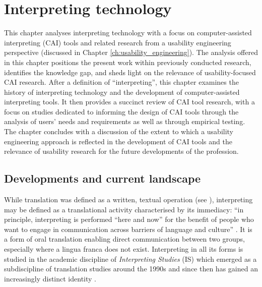 \chapter{Interpreting technology}\label{ch:interpreting_technology}

This chapter analyses interpreting technology with a focus on computer-assisted interpreting (CAI) tools and related research from a usability engineering perspective (discussed in Chapter \ref{ch:usability_engineering}). The analysis offered in this chapter positions the present work within previously conducted research, identifies the knowledge gap, and sheds light on the relevance of usability-focused CAI research. After a definition of ``interpreting'', this chapter examines the history of interpreting technology and the development of computer-assisted interpreting tools. It then provides a succinct review of CAI tool research, with a focus on studies dedicated to informing the design of CAI tools through the analysis of users’ needs and requirements as well as through empirical testing. The chapter concludes with a discussion of the extent to which a usability engineering approach is reflected in the development of CAI tools and the relevance of usability research for the future developments of the profession.

\section{Developments and current landscape}

While translation was defined as a written, textual operation (see ), interpreting may be defined as a translational activity characterised by its immediacy: ``in principle, interpreting is performed “here and now” for the benefit of people who want to engage in communication across barriers of language and culture'' \citep[10]{pochhacker2004}. It is a form of oral translation enabling direct communication between two groups, especially where a lingua franca does not exist. Interpreting in all its forms is studied in the academic discipline of \textit{Interpreting Studies} (IS) which emerged as a subdiscipline of translation studies around the 1990s and since then has gained an increasingly distinct identity \citep{pochhacker2015a}.

